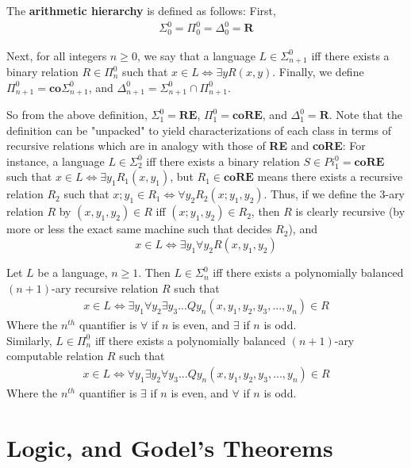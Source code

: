 \begin{definition}
    The \textbf{arithmetic hierarchy} is defined as follows: First,
    \begin{align}
        \Sigma_0^0 = \Pi_0^0 = \Delta_0^0 = \textbf{R}
    \end{align}
    \par Next, for all integers $n \geq 0$, we say that a language $L \in \Sigma_{n+1}^0$ iff there exists a binary relation $R \in \Pi_n^0$ such that $x \in L \iff \exists y R(x,y)$. Finally, we define $\Pi_{n+1}^0 = \textbf{co}\Sigma_{n+1}^0$, and $\Delta_{n+1}^0 = \Sigma_{n+1}^0 \cap \Pi_{n+1}^0$.
\end{definition}
So from the above definition, $\Sigma_1^0 = \textbf{RE}$, $\Pi_1^0 = \textbf{coRE}$, and $\Delta_1^0 = \textbf{R}$. Note that the definition can be "unpacked" to yield characterizations of each class in terms of recursive relations which are in analogy with those of \textbf{RE} and \textbf{coRE}: For instance, a language $L \in \Sigma_2^0$ iff there exists a binary relation $S \in Pi_1^0 = \textbf{coRE}$ such that $x \in L \iff \exists y_1 R_1(x,y_1)$, but $R_1 \in \textbf{coRE}$ means there exists a recursive relation $R_2$ such that $x;y_1 \in R_1 \iff \forall y_2 R_2(x;y_1,y_2)$. Thus, if we define the $3$-ary relation $R$ by $(x,y_1,y_2) \in R$ iff $(x;y_1,y_2) \in R_2$, then $R$ is clearly recursive (by more or less the exact same machine such that decides $R_2$), and  
\[ x \in L \iff \exists y_1 \forall y_2 R(x,y_1,y_2) \] 
\begin{corollary}
    Let $L$ be a language, $n \geq 1$. Then $L \in \Sigma_n^0$ iff there exists a polynomially balanced $(n+1)$-ary recursive relation $R$ such that
    \begin{align}
        x \in L \iff \exists y_1 \forall y_2 \exists y_3 ... Q y_n(x,y_1,y_2,y_3,...,y_n) \in R
    \end{align}
    Where the $n^{th}$ quantifier is $\forall$ if $n$ is even, and $\exists$ if $n$ is odd. \\
    Similarly, $L \in \Pi_n^0$ iff there exists a polynomially balanced $(n+1)$-ary computable relation $R$ such that
    \begin{align}
         x \in L \iff \forall y_1 \exists y_2 \forall y_3 ... Q y_n(x,y_1,y_2,y_3,...,y_n) \in R
    \end{align}
    Where the $n^{th}$ quantifier is $\exists$ if $n$ is even, and $\forall$ if $n$ is odd.
\end{corollary}
\section{Logic, and Godel's Theorems}

